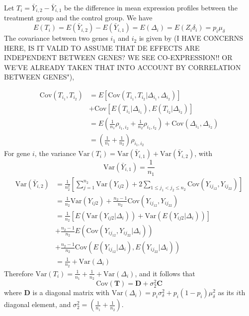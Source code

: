 \documentclass[useAMS,usenatbib, galley]{biom}
\begin{document}
	Let $T_i=\bar{Y}_{i,2}-\bar{Y}_{i,1}$ be the difference in mean expression profiles between the treatment group and the control group. We have 
	\[E(T_i) = E(\bar{Y}_{i,2})-E(\bar{Y}_{i,1}) = E(\Delta_i) = E(Z_i\delta_i) = p_i\mu_{\delta}\]
	The covariance between two genes $i_1$ and $i_2$ is given by (I HAVE CONCERNS HERE, IS IT VALID TO ASSUME THAT DE EFFECTS ARE INDEPENDENT BETWEEN GENES?  WE SEE CO-EXPRESSION!! OR WE'VE ALREADY TAKEN THAT INTO ACCOUNT BY CORRELATION BETWEEN GENES"), 
	
	\begin{equation}
	\begin{aligned}
	\text{Cov}(T_{i_1}, T_{i_2}) & = E\left[\text{Cov}(T_{i_1}, T_{i_2}|\Delta_{i_1}, \Delta_{i_2}) \right] \\
	&  + \text{Cov}\left[E(T_{i_1}|\Delta_{i_1}), E(T_{i_2}|\Delta_{i_2})\right] \\
	& = E\left(\frac{1}{n_1}\rho_{i_1,i_2} + \frac{1}{n_2}\rho_{i_1,i_2}\right) + \text{Cov}(\Delta_{i_1}, \Delta_{i_2})\\
	& = \left(\frac{1}{n_1} + \frac{1}{n_2}\right)\rho_{i_1,i_2}
	\end{aligned}
	\end{equation}
	For gene $i$, the variance $\text{Var}(T_i) = \text{Var}(\bar{Y}_{i, 1}) + \text{Var}(\bar{Y}_{i, 2})$, with
	\[\text{Var}(\bar{Y}_{i, 1}) = \frac{1}{n_1}\] 
	\begin{equation}
	\begin{aligned}
	\text{Var}(\bar{Y}_{i, 2}) & = \frac{1}{n_2^2}\left[\sum_{j=1}^{n_2}\text{Var}(Y_{ij2}) + 2\sum_{1\leq j_1<j_2 \leq n_2} \text{Cov}(Y_{ij_12}, Y_{ij_22})\right] \\
	& = \frac{1}{n_2}\text{Var}(Y_{ij2}) + \frac{n_2-1}{n_2} \text{Cov}(Y_{ij_12}, Y_{ij_22})\\
	& = \frac{1}{n_2}\left[E\left(\text{Var}(Y_{ij2}|\Delta_i)\right) + \text{Var}\left(E(Y_{ij2}|\Delta_i)\right)\right] \\ \text{~~~} &+\frac{n_2-1}{n_2}E\left(\text{Cov}(Y_{ij_12}, Y_{ij_22}|\Delta_i)\right) \\ &+\frac{n_2-1}{n_2}\text{Cov}\left(E(Y_{ij_12}|\Delta_i), E(Y_{ij_22}|\Delta_i)\right) \\
	& = \frac{1}{n_2} + \text{Var}(\Delta_i)
	\end{aligned}
	\end{equation}
	Therefore $\text{Var}(T_i)  = \frac{1}{n_1} + \frac{1}{n_2} + \text{Var}(\Delta_i)$, and it follows that
	\begin{equation}\label{eq:tvar}
	\text{Cov}(\bm T) =  \bm D + \sigma_2^2\bm C 
	\end{equation}
	where $\bm D$ is a diagonal matrix with $\text{Var}(\Delta_i) =p_i\sigma_{\delta}^2 + p_i(1-p_i)\mu_{\delta}^2$ as its $i$th diagonal element, and $\sigma_2^2 = \left(\frac{1}{n_1} + \frac{1}{n_2}\right)$.
	
	
	
	
	
\end{document}
